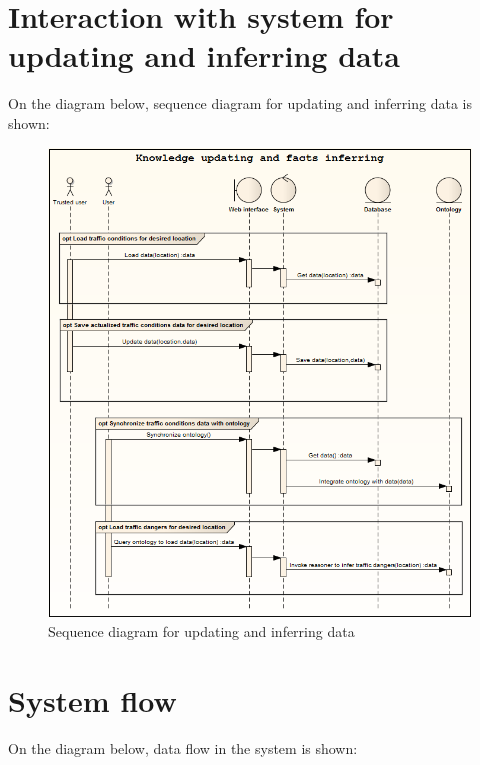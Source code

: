 \newpage

\section{Interaction with system for updating and inferring data}
\label{sec:interaction}

On the diagram below, sequence diagram for updating and inferring data is shown:

\medskip

\begin{figure}[htp]
\centering
\includegraphics[scale=0.58]{images/chapter4/Sequence}
\caption{Sequence diagram for updating and inferring data}
\label{fig:sequence}
\end{figure}

\newpage

\section{System flow}
\label{sec:systemFlow}

On the diagram below, data flow in the system is shown:

\medskip

